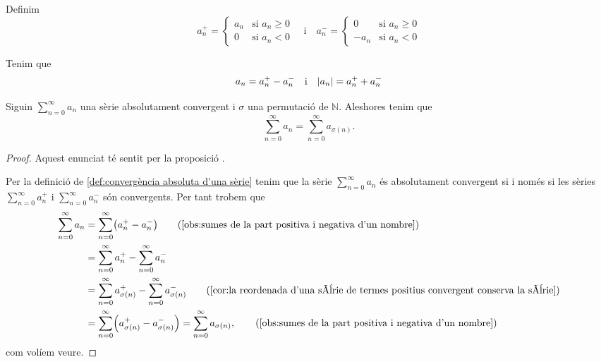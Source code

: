 \documentclass[../Apunts.tex]{subfiles}
\begin{document}
	\begin{notation}
		\label{notation:part positiva d'un nombre}
		\label{notation:part negativa d'un nombre}
		Definim
		\[a^{+}_{n}=\begin{cases}
			a_{n} & \text{si }a_{n}\geq0 \\
			0 & \text{si }a_{n}<0
		\end{cases}\quad\text{i}\quad
		a^{-}_{n}=\begin{cases}
			0 & \text{si }a_{n}\geq0 \\
			-a_{n} & \text{si }a_{n}<0
		\end{cases}\]
	\end{notation}
	\begin{observation}
		\label{obs:sumes de la part positiva i negativa d'un nombre}
		Tenim que
		\[a_{n}=a^{+}_{n}-a^{-}_{n}\quad\text{i}\quad\abs{a_{n}}=a^{+}_{n}+a^{-}_{n}\]
	\end{observation}
	\begin{lemma}
		Siguin \(\sum_{n=0}^{\infty}a_{n}\) una sèrie absolutament convergent i \(\sigma\) una permutació de \(\mathbb{N}\). Aleshores tenim que
		\[\sum_{n=0}^{\infty}a_{n}=\sum_{n=0}^{\infty}a_{\sigma(n)}.\]
		\begin{proof}
			Aquest enunciat té sentit per la proposició .
			
			Per la definició de \ref{def:convergència absoluta d'una sèrie} tenim que la sèrie \(\sum_{n=0}^{\infty}a_{n}\) és absolutament convergent si i només si les sèries \(\sum_{n=0}^{\infty}a^{+}_{n}\) i \(\sum_{n=0}^{\infty}a^{-}_{n}\) són convergents. Per tant trobem que
			\begin{align*}
				\sum_{n=0}^{\infty}a_{n}&=\sum_{n=0}^{\infty}\left(a^{+}_{n}-a^{-}_{n}\right) \tag{\ref{obs:sumes de la part positiva i negativa d'un nombre}}\\
				&=\sum_{n=0}^{\infty}a^{+}_{n}-\sum_{n=0}^{\infty}a^{-}_{n} \\
				&=\sum_{n=0}^{\infty}a^{+}_{\sigma(n)}-\sum_{n=0}^{\infty}a^{-}_{\sigma(n)} \tag{\ref{cor:la reordenada d'una sèrie de termes positius convergent conserva la sèrie}}\\
				&=\sum_{n=0}^{\infty}\left(a^{+}_{\sigma(n)}-a^{-}_{\sigma(n)}\right)=\sum_{n=0}^{\infty}a_{\sigma(n)}, \tag{\ref{obs:sumes de la part positiva i negativa d'un nombre}}
			\end{align*}
			com volíem veure.
		\end{proof}
	\end{lemma}
\end{document}
